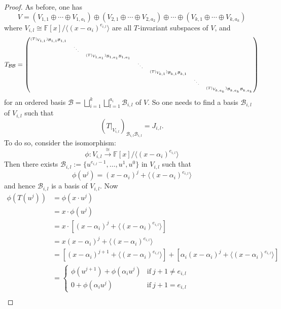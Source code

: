 \documentclass[11pt,openany]{book}
\theoremstyle{plain}
\theoremstyle{definition}
\theoremstyle{remark}
\begin{document}
\begin{proof}
As before, one has 
$$V= (V_{1,1} \oplus \cdots \oplus V_{1,a_1}) \oplus 
(V_{2,1} \oplus \cdots \oplus V_{2,a_2}) \oplus \cdots \oplus 
(V_{k,1} \oplus \cdots \oplus V_{k,a_k})$$
where $V_{i,l} \cong \mathbb{F}[x]/\langle (x-\alpha_i)^{e_{i,l}} \rangle$ are all $T$-invariant subspaces of $V$, and
$$T_{\mathcal{B}\mathcal{B}} = \tiny{\begin{pmatrix} (T|_{V_{1,1}})_{\mathcal{B}_{1,1}\mathcal{B}_{1,1}} & & & & & \\
& \ddots & & & & & \\ 
& & (T|_{V_{1,a_1}})_{\mathcal{B}_{1,a_1}\mathcal{B}_{1,a_1}} & & & & \\
& & & \ddots & & &\\
& & & & (T|_{V_{k,1}})_{\mathcal{B}_{k,1}\mathcal{B}_{k,1}} & & \\
& & & & & \ddots & \\
& & & & & & (T|_{V_{k,a_k}})_{\mathcal{B}_{k,a_k}\mathcal{B}_{k,a_k}}\end{pmatrix}}
$$
for an ordered basis $\displaystyle \mathcal{B} = \bigsqcup_{i=1}^k \bigsqcup_{l = 1}^{a_i} \mathcal{B}_{i,l}$ of $V$. So one needs to find a basis $\mathcal{B}_{i,l}$ of $V_{i,l}$ such that
$$(T|_{V_{i,l}})_{\mathcal{B}_{i,l}\mathcal{B}_{i,l}} = J_{i,l}.$$
To do so, consider the isomorphism:
$$\phi: V_{i,l} \xrightarrow{\cong} \mathbb{F}[x]/\langle (x-\alpha_i)^{e_{i,l}}\rangle$$
Then there exists $\mathcal{B}_{i,l} := \{u^{e_{i,l}-1}, \dots, u^{1}, u^0\}$ in $V_{i,l}$ such that
$$\phi(u^{j}) = (x-\alpha_i)^j + \langle (x - \alpha_i)^{e_{i,l}} \rangle$$
and hence $\mathcal{B}_{i,l}$ is a basis of $V_{i,l}$. Now
\begin{align*}\phi(T(u^j)) &= \phi(x \cdot u^j)\\
&= x \cdot \phi(u^j) \\
&= x \cdot [(x-\alpha_i)^j + \langle (x - \alpha_i)^{e_{i,l}} \rangle]\\ 
&= x(x-\alpha_i)^j + \langle (x - \alpha_i)^{e_{i,l}} \rangle \\
&= [(x-\alpha_i)^{j+1} + \langle (x - \alpha_i)^{e_{i,l}} \rangle] + [\alpha_i(x-\alpha_i)^{j} + \langle (x - \alpha_i)^{e_{i,l}} \rangle] \\
&= \begin{cases} \phi(u^{j+1}) + \phi( \alpha_i u^j) & \text{if}\ j+1 \neq e_{i,l} \\
0 + \phi( \alpha_i u^j) & \text{if}\ j+1 = e_{i,l} \end{cases} \\

\end{align*}
\end{proof}
\end{document}
